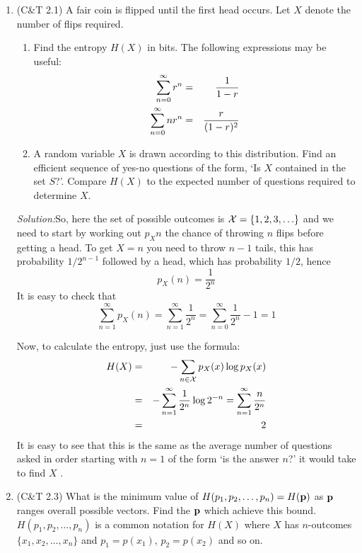 \documentclass[12pt]{article}
\newcommand{\soln}{\noindent\textit{Solution:}}
\begin{document}
\begin{enumerate}
\item (C\&T 2.1) A fair coin is flipped until the first head occurs. Let $X$ denote the number of flips required.
\begin{enumerate}
\item Find the entropy $H(X)$ in bits. The following expressions may be useful:\begin{eqnarray}
\sum_{n=0}^{\infty} r^n&=&\frac{1}{1-r}\cr
\sum_{n=0}^{\infty}nr^n&=&\frac{r}{(1-r)^2}
\end{eqnarray}
\item A random variable $X$ is drawn according to this distribution. Find an efficient sequence of yes-no questions of the form, \lq Is $X$ contained in the set $S$?\rq{}. Compare $H(X)$ to the expected number of questions required to determine $X$.
\end{enumerate}

\soln So, here the set of possible outcomes is ${\cal X}=\{1,2,3,\ldots\}$ and we need to start by working out $p_X{n}$ the chance of throwing $n$ flips before getting a head. To get $X=n$ you need to throw $n-1$ tails, this has probability $1/2^{n-1}$ followed by a head, which has probability $1/2$, hence
\begin{equation}
p_X(n)=\frac{1}{2^n}
\end{equation}
It is easy to check that 
\begin{equation}
\sum_{n=1}^{\infty}p_X(n)=\sum_{n=1}^{\infty}\frac{1}{2^n}=\sum_{n=0}^{\infty}\frac{1}{2^n}-1=1
\end{equation}

Now, to calculate the entropy, just use the formula:
\begin{eqnarray}
H(X)&=&-\sum_{n\in {\cal X}}p_X(x)\log{p_X(x)}\cr
    &=&-\sum_{n=1}^{\infty}\frac{1}{2^n}\log{2^{-n}}=\sum_{n=1}^\infty\frac{n}{2^n}\cr
&=&2
\end{eqnarray}
It is easy to see that this is the same as the average number of questions asked in order starting with $n=1$ of the form \lq is the answer $n$?\rq{} it would take to find $X$ .


\item (C\&T 2.3) What is the minimum value of $H(p_1,p_2,\ldots,p_n)=H({\bf p})$ as ${\bf p}$ ranges overall possible vectors. Find the ${\bf p}$ which achieve this bound. $H(p_1,p_2,\ldots,p_n)$ is a common notation for $H(X)$ where $X$ has $n$-outcomes $\{x_1,x_2,\ldots,x_n\}$ and $p_1=p(x_1)$, $p_2=p(x_2)$ and so on.



\end{enumerate}
\end{document}
